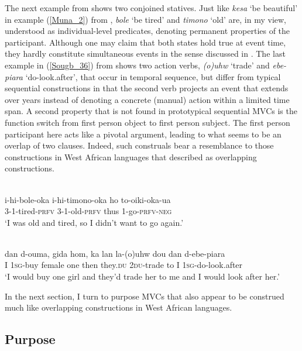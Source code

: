 The next example from  shows two conjoined statives. Just like \textit{kesa} `be beautiful' in example (\ref{Muna_2}) from , \textit{bole} `be tired' and \textit{timono} `old' are, in my view, understood as individual-level predicates, denoting permanent properties of the participant. Although one may claim that both states hold true at event time, they hardly constitute simultaneous events in the sense discussed in . The last example in (\ref{Sougb_36}) from  shows two action verbs, \textit{(o)uhw} `trade' and \textit{ebe-piara} `do-look.after', that occur in temporal sequence, but differ from typical sequential constructions in that the second verb projects an event that extends over years instead of denoting a concrete (manual) action within a limited time span. A second property that is not found in prototypical sequential MVCs is the function switch from first person object to first person subject. The first person participant here acts like a pivotal argument, leading to what seems to be an overlap of two clauses. Indeed, such construals bear a resemblance to those constructions in West African languages that \citet{ameka2005multiverb} described as overlapping constructions.

\ea 
{}\\
\gll i-hi-bole-oka i-hi-timono-oka ho to-oiki-oka-ua \\
3-1-tired-\textsc{prfv} 3-1-old-\textsc{prfv} thus 1-go-\textsc{prfv}-\textsc{neg} \\
\glft `I was old and tired, so I didn't want to go again.'\\ 
\z

\ea \label{Sougb_36}
\\
\gll dan d-ouma, gida hom, ka lan la-(o)uhw dou dan d-ebe-piara \\
I 1\textsc{sg}-buy female one then they.\textsc{du} 2\textsc{du}-trade to I 1\textsc{sg}-do-look.after \\
\glft `I would buy one girl and they'd trade her to me and I would look after her.'\\ 
\z

In the next section, I turn to purpose MVCs that also appear to be construed much like overlapping constructions in West African languages.

\subsection{Purpose} \label{sec:purpose}


